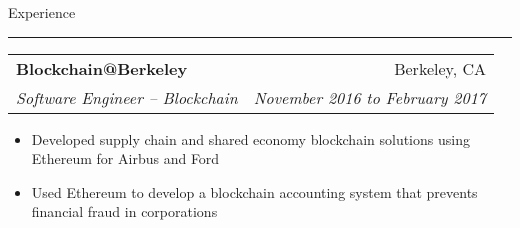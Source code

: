 \documentclass[11pt,letterpaper]{article}
\makeatletter
\newenvironment{topic}[1]
    {
    {\Large \centerline{#1}}
    \vspace*{0.03in}
    \hrule 
    \vspace*{0.05in}
    }
    {}
\newenvironment{event}
    {
    \begin{tabular*}{\textwidth}{l@{\extracolsep{\fill}}r}
    }
    {
    \end{tabular*}
    }
\makeatother
\begin{document}
\begin{topic}{Experience}
        \begin{event}
            \textbf{Blockchain@Berkeley} & Berkeley, CA \\
            \emph{Software Engineer -- Blockchain} & \emph{November 2016 to February 2017}
        \end{event}
            \begin{itemize}
                \item Developed supply chain and shared economy blockchain solutions using Ethereum for Airbus and Ford
                \item Used Ethereum to develop a blockchain accounting system that prevents financial fraud in corporations
            \end{itemize}
        
    \end{topic} \vspace*{0.1in}
\end{document}
